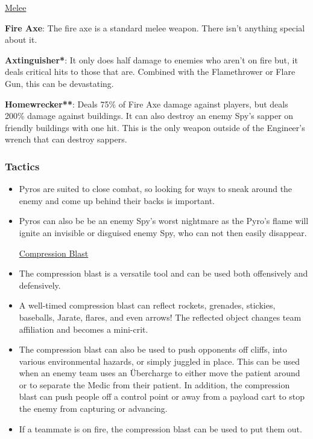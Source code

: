 \newpage

\begin {center}
\underline {Melee}
\end {center}

{\bf Fire Axe}: The fire axe is a standard melee weapon.  There isn't anything special about it.

{\bf Axtinguisher*}: It only does half damage to enemies who aren't on fire but, it deals critical hits to those that are. Combined with the Flamethrower or Flare Gun, this can be devastating. 

{\bf Homewrecker**}: Deals 75\% of Fire Axe damage against players, but deals 200\% damage against buildings. It can also destroy an enemy Spy's sapper on friendly buildings with one hit. This is the only weapon outside of the Engineer's wrench that can destroy sappers.


\subsubsection {Tactics}
\begin {itemize}
\item Pyros are suited to close combat, so looking for ways to sneak around the enemy and come up behind their backs is important.

\item Pyros can also be be an enemy Spy's worst nightmare as the Pyro's flame will ignite an invisible or disguised enemy Spy, who can not then easily disappear.
\begin {center}
\underline {Compression Blast}
\end {center}
\item The compression blast is a versatile tool and can be used both offensively and defensively.

\item A well-timed compression blast can reflect rockets, grenades, stickies, baseballs, Jarate, flares, and even arrows! The reflected object changes team affiliation and becomes a mini-crit.

\item The compression blast can also be used to push opponents off cliffs, into various environmental hazards, or simply juggled in place. This can be used when an enemy team uses an Übercharge to either move the patient around or to separate the Medic from their patient. In addition, the compression blast can push people off a control point or away from a payload cart to stop the enemy from capturing or advancing.

\item If a teammate is on fire, the compression blast can be used to put them out.
\end {itemize}